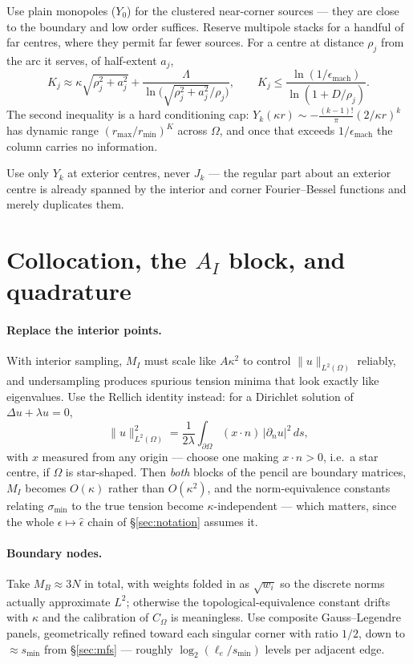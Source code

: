 \documentclass[11pt]{article}
\begin{document}
Use plain monopoles ($Y_0$) for the clustered near-corner sources --- they are close to
the boundary and low order suffices. Reserve multipole stacks for a handful of far
centres, where they permit far fewer sources. For a centre at distance $\rho_j$ from
the arc it serves, of half-extent $a_j$,
\[
  K_j\approx \kappa\sqrt{\rho_j^2+a_j^2}
    +\frac{\Lambda}{\ln\!\big(\sqrt{\rho_j^2+a_j^2}/\rho_j\big)},
  \qquad
  K_j\le \frac{\ln(1/\epsilon_{\mathrm{mach}})}{\ln(1+D/\rho_j)} .
\]
The second inequality is a hard conditioning cap:
$Y_k(\kappa r)\sim -\frac{(k-1)!}{\pi}(2/\kappa r)^k$ has dynamic range
$(r_{\max}/r_{\min})^{K}$ across $\Omega$, and once that exceeds
$1/\epsilon_{\mathrm{mach}}$ the column carries no information.

Use only $Y_k$ at exterior centres, never $J_k$ --- the regular part about an exterior
centre is already spanned by the interior and corner Fourier--Bessel functions and
merely duplicates them.

\section{Collocation, the \texorpdfstring{$A_I$}{A\_I} block, and quadrature}
\label{sec:colloc}

\paragraph{Replace the interior points.} With interior sampling, $M_I$ must scale like
$A\kappa^2$ to control $\|u\|_{L^2(\Omega)}$ reliably, and undersampling produces
spurious tension minima that look exactly like eigenvalues. Use the Rellich identity
instead: for a Dirichlet solution of $\Delta u+\lambda u=0$,
\begin{equation}
  \|u\|_{L^2(\Omega)}^2
  =\frac{1}{2\lambda}\int_{\partial\Omega}(x\cdot n)\,|\partial_n u|^2\,ds ,
  \label{eq:rellich}
\end{equation}
with $x$ measured from any origin --- choose one making $x\cdot n>0$, i.e.\ a star
centre, if $\Omega$ is star-shaped. Then \emph{both} blocks of the pencil are boundary
matrices, $M_I$ becomes $O(\kappa)$ rather than $O(\kappa^2)$, and the
norm-equivalence constants relating $\sigma_{\min}$ to the true tension become
$\kappa$-independent --- which matters, since the whole $\epsilon\mapsto\hat\epsilon$
chain of \S\ref{sec:notation} assumes it.

\paragraph{Boundary nodes.} Take $M_B\approx 3N$ in total, with weights folded in as
$\sqrt{w_i}$ so the discrete norms actually approximate $L^2$; otherwise the
topological-equivalence constant drifts with $\kappa$ and the calibration of
$C_\Omega$ is meaningless. Use composite Gauss--Legendre panels, geometrically refined
toward each singular corner with ratio $1/2$, down to $\approx s_{\min}$ from
\S\ref{sec:mfs} --- roughly $\log_2(\ell_e/s_{\min})$ levels per adjacent edge.
\end{document}
